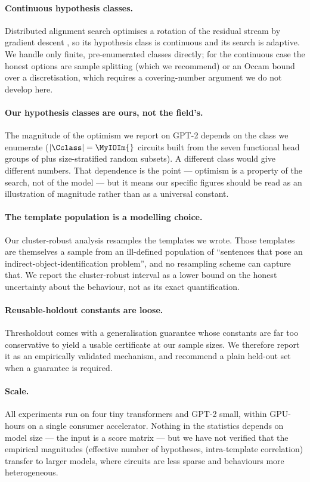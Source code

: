 \paragraph{Continuous hypothesis classes.}
Distributed alignment search optimises a rotation of the residual stream by
gradient descent \citep{geiger2024finding}, so its hypothesis class is
continuous and its search is adaptive. We handle only finite, pre-enumerated
classes directly; for the continuous case the honest options are sample splitting
(which we recommend) or an Occam bound over a discretisation, which requires a
covering-number argument we do not develop here.

\paragraph{Our hypothesis classes are ours, not the field's.}
The magnitude of the optimism we report on GPT-2 depends on the class we
enumerate ($|\Cclass|=\MyIOIm{}$ circuits built from the seven functional head
groups of \citet{wang2023interpretability} plus size-stratified random subsets).
A different class would give different numbers. That dependence is the point ---
optimism is a property of the search, not of the model --- but it means our
specific figures should be read as an illustration of magnitude rather than as a
universal constant.

\paragraph{The template population is a modelling choice.}
Our cluster-robust analysis resamples the \MyIOINTemplates{} templates we wrote.
Those templates are themselves a sample from an ill-defined population of
``sentences that pose an indirect-object-identification problem'', and no
resampling scheme can capture that. We report the cluster-robust interval as a
lower bound on the honest uncertainty about the behaviour, not as its exact
quantification.

\paragraph{Reusable-holdout constants are loose.}
Thresholdout \citep{dwork2015reusable} comes with a generalisation guarantee
whose constants are far too conservative to yield a usable certificate at our
sample sizes. We therefore report it as an empirically validated mechanism, and
recommend a plain held-out set when a guarantee is required.

\paragraph{Scale.}
All experiments run on four tiny transformers and GPT-2 small, within
\MyComputeHours{} GPU-hours on a single consumer accelerator. Nothing in the
statistics depends on model size --- the input is a score matrix --- but we have
not verified that the empirical magnitudes (effective number of hypotheses,
intra-template correlation) transfer to larger models, where circuits are less
sparse and behaviours more heterogeneous.
